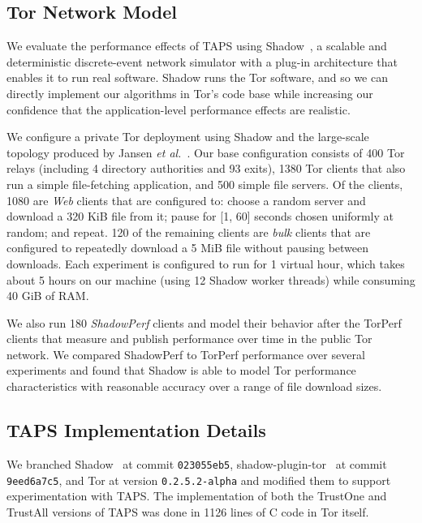 \documentclass[conference]{styles/IEEEtran}
\newcommand{\etal}{\emph{et al.}}
\newcommand{\ps}{TAPS\xspace}
\begin{document}
\subsection{Tor Network Model}

We evaluate the performance effects of \ps using
Shadow~\cite{jansen2012shadow,shadowweb}, a scalable and deterministic
discrete-event network simulator with a plug-in architecture that enables it to
run real software. Shadow runs the Tor software, and so we
can directly implement our algorithms in Tor's code base while increasing our
confidence that the application-level performance effects are realistic.

We configure a private Tor deployment using Shadow and the large-scale
topology produced by Jansen \etal~\cite{jansen2014kist}. Our base configuration
consists of 400 Tor relays (including 4 directory authorities and 93 exits), 1380 Tor
clients that also run a simple file-fetching application, and 500 simple file
servers. Of the clients, 1080 are \emph{Web} clients that are configured to: choose a
random server and download a 320 KiB file from it; pause for [1, 60] seconds
chosen uniformly at random; and repeat. 120 of the remaining clients are \emph{bulk}
clients that are configured to repeatedly download a 5 MiB file without pausing
between downloads. Each experiment is configured to run for 1 virtual hour, which
takes about 5 hours on our machine (using 12 Shadow worker threads) while
consuming 40 GiB of RAM.

We also run 180 \emph{ShadowPerf} clients and model their behavior after the
TorPerf~\cite{torperf} clients that measure and publish performance over time in
the public Tor network. We compared ShadowPerf to TorPerf performance over several
experiments and found that Shadow is able to model Tor performance characteristics
with reasonable accuracy over a range of file download sizes.



\subsection{\ps Implementation Details}

We branched Shadow~\cite{shadowgit} at commit \texttt{023055eb5},
shadow-plugin-tor~\cite{shadowtorgit} at commit \texttt{9eed6a7c5}, and Tor at
version \texttt{0.2.5.2-alpha} and modified them to support experimentation with
\ps. The implementation of both the TrustOne and TrustAll 
versions of \ps was done in 1126 lines of C code in Tor itself.
\end{document}
